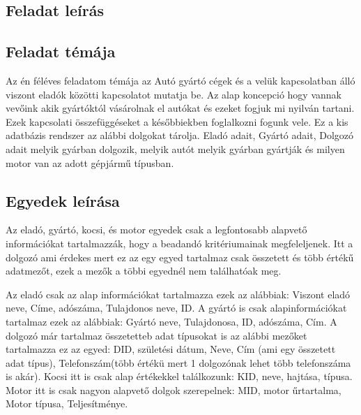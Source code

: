 \documentclass[14pt]{extarticle}
\begin{document}
    \newpage
    \tableofcontents
    \newpage
	\begin{normalsize}
		\section{Feladat leírás}
		\subsection{Feladat témája}
		\begin{normalsize}
			Az én féléves feladatom témája az Autó gyártó cégek és a velük kapcsolatban álló viszont eladók közötti kapcsolatot mutatja be. Az alap koncepció hogy vannak vevőink akik gyártóktól vásárolnak el autókat és ezeket fogjuk mi nyilván tartani. Ezek kapcsolati összefüggéseket a későbbiekben foglalkozni fogunk vele. Ez a kis adatbázis rendszer az alábbi dolgokat tárolja. Eladó adait, Gyártó adait, Dolgozó adait melyik gyárban dolgozik, melyik autót melyik gyárban gyártják és milyen motor van az adott gépjármű típusban.
		\end{normalsize}
		\subsection{Egyedek leírása}
		\begin{normalsize}
			Az eladó, gyártó, kocsi, és motor egyedek csak a legfontosabb alapvető információkat tartalmazzák, hogy a beadandó kritériumainak megfeleljenek.\newline
			Itt a dolgozó ami érdekes mert ez az egy egyed tartalmaz csak összetett és több értékű adatmezőt, ezek a mezők a többi egyednél nem találhatóak meg.\newline
			
			Az eladó csak az alap információkat tartalmazza ezek az alábbiak: Viszont eladó neve, Címe, adószáma, Tulajdonos neve, ID.\newline
			A gyártó is csak alapinformációkat tartalmaz ezek az alábbiak: Gyártó neve, Tulajdonosa, ID, adószáma, Cím.\newline
			A dolgozó már tartalmaz összetetteb adat típusokat is az alábbi mezőket tartalmazza ez az egyed: DID, születési dátum, Neve, Cím (ami egy összetett adat típus), Telefonszám(több értékü mert 1 dolgozónak lehet több telefonszáma is akár).\newline
			Kocsi itt is csak alap értékekkel találkozunk: KID, neve, hajtása, típusa.\newline
			Motor itt is csak nagyon alapvető dolgok szerepelnek: MID, motor űrtartalma, Motor típusa, Teljesítménye.\newline
			

\end{normalsize}
\end{normalsize}
\end{document}
